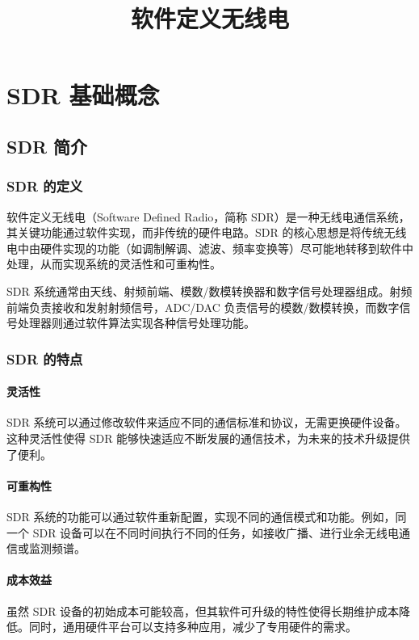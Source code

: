 ﻿\documentclass[UTF8]{ctexbook}
\title{软件定义无线电}
\author{}
\date{}
\begin{document}
\maketitle

\tableofcontents

\chapter{SDR 基础概念}
\section{SDR 简介}
\subsection{SDR 的定义}
软件定义无线电（Software Defined Radio，简称 SDR）是一种无线电通信系统，其关键功能通过软件实现，而非传统的硬件电路。SDR 的核心思想是将传统无线电中由硬件实现的功能（如调制解调、滤波、频率变换等）尽可能地转移到软件中处理，从而实现系统的灵活性和可重构性。

SDR 系统通常由天线、射频前端、模数/数模转换器和数字信号处理器组成。射频前端负责接收和发射射频信号，ADC/DAC 负责信号的模数/数模转换，而数字信号处理器则通过软件算法实现各种信号处理功能。

\subsection{SDR 的特点}
\subsubsection{灵活性}
SDR 系统可以通过修改软件来适应不同的通信标准和协议，无需更换硬件设备。这种灵活性使得 SDR 能够快速适应不断发展的通信技术，为未来的技术升级提供了便利。

\subsubsection{可重构性}
SDR 系统的功能可以通过软件重新配置，实现不同的通信模式和功能。例如，同一个 SDR 设备可以在不同时间执行不同的任务，如接收广播、进行业余无线电通信或监测频谱。

\subsubsection{成本效益}
虽然 SDR 设备的初始成本可能较高，但其软件可升级的特性使得长期维护成本降低。同时，通用硬件平台可以支持多种应用，减少了专用硬件的需求。
\end{document}
